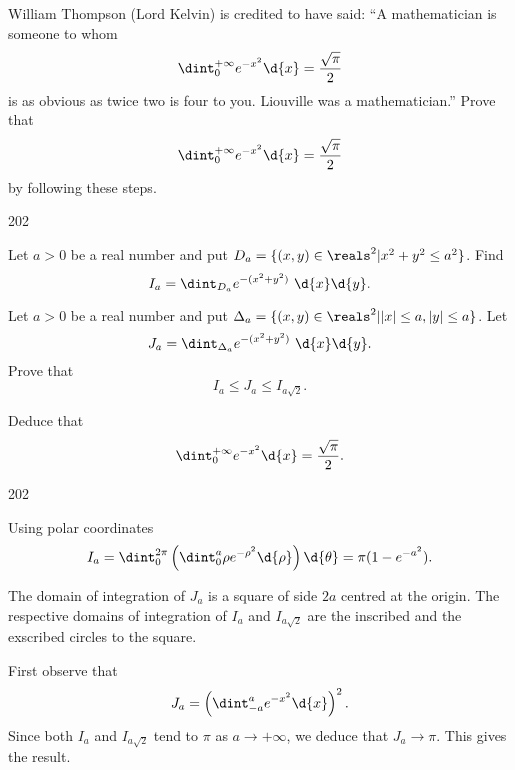 \begin{pro}
William Thompson (Lord Kelvin) is credited to have said: ``A
mathematician is someone to whom
$$\dint _0 ^{+\infty} e^{-x^2} \d{x}= \frac{\sqrt{\pi}}{2}$$is
as obvious as twice two is four to you. Liouville was a
mathematician.'' Prove that $$\dint _0 ^{+\infty} e^{-x^2} \d{x}=
\frac{\sqrt{\pi}}{2}$$ by following these steps.
\begin{dingautolist}{202}
\item  Let $a > 0$ be a real number and put $D_a = \{(x,
y)\in\reals^2| x^2 + y^2 \leq a^2\}$. Find
$$I_a = \dint _{D_a} e^{-(x^2 + y^2)} \ \d{x} \d{y}.$$
\item  Let $a > 0$ be a real number and put $\Delta_a = \{(x,
y)\in\reals^2| |x| \leq a, |y| \leq a\}$. Let
$$J_a = \dint _{\Delta_a} e^{-(x^2 + y^2)} \ \d{x} \d{y}.$$Prove that
$$I_a \leq J_a \leq I_{a\sqrt{2}}.$$
\item  Deduce that
$$\dint _0 ^{+\infty} e^{-x^2} \d{x}= \frac{\sqrt{\pi}}{2}.$$

\end{dingautolist}
\begin{answer}
\begin{dingautolist}{202}
\item   Using polar coordinates
$$I_a = \dint_0 ^{2\pi}\left(\dint _0 ^a\rho 
e^{-\rho^2}\d{\rho}\right)\d{\theta} = \pi(1 - e^{-a^2}).$$
\item   The domain of integration of $J_a$ is a square of side
$2a$ centred at the origin. The respective domains of integration of
$I_a$ and $I_{a\sqrt{2}}$ are the inscribed and the exscribed
circles to the square. \item  First observe that
$$J_a = \left(\dint_{-a} ^a e^{-x^2}\d{x}\right)^2.$$ Since both
$I_a$ and $I_{a\sqrt{2}}$ tend to $\pi$ as $a\rightarrow +\infty$,
we deduce that $J_a \rightarrow \pi.$ This gives the result.

\end{dingautolist}
\end{answer}
\end{pro}
